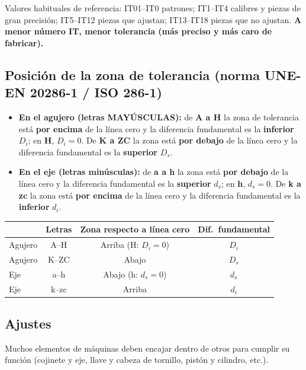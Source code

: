 \documentclass[12pt,a4paper]{article}
\begin{document}
Valores habituales de referencia: IT01--IT0 patrones; IT1--IT4 calibres y
piezas de gran precisión; IT5--IT12 piezas que ajustan; IT13--IT18 piezas que
no ajustan. \textbf{A menor número IT, menor tolerancia (más preciso y más
	caro de fabricar).}

\subsection{Posición de la zona de tolerancia (norma UNE-EN 20286-1 / ISO
	286-1)}
\begin{itemize}
	\item \textbf{En el agujero (letras MAYÚSCULAS):} de \textbf{A a H} la zona de
	      tolerancia está \textbf{por encima} de la línea cero y la diferencia
	      fundamental
	      es la \textbf{inferior} $D_i$; en \textbf{H}, $D_i = 0$. De \textbf{K a
		      ZC} la
	      zona está \textbf{por debajo} de la línea cero y la diferencia
	      fundamental es la
	      \textbf{superior} $D_s$.
	\item \textbf{En el eje (letras minúsculas):} de \textbf{a a h} la zona está
	      \textbf{por debajo} de la línea cero y la diferencia fundamental es la
	      \textbf{superior} $d_s$; en \textbf{h}, $d_s = 0$. De \textbf{k a zc} la
	      zona
	      está \textbf{por encima} de la línea cero y la diferencia fundamental es
	      la
	      \textbf{inferior} $d_i$.
\end{itemize}

\begin{center}
	\small
	\begin{tabular}{@{}lccc@{}}
		\toprule
		        & \textbf{Letras} & \textbf{Zona respecto a línea cero} &
		\textbf{Dif.\ fundamental}                                              \\
		\midrule
		Agujero & A--H            & Arriba (H: $D_i=0$)                 & $D_i$
		\\
		Agujero & K--ZC           & Abajo                               & $D_s$ \\
		Eje     & a--h            & Abajo (h: $d_s=0$)                  & $d_s$ \\
		Eje     & k--zc           & Arriba                              & $d_i$ \\
		\bottomrule
	\end{tabular}
\end{center}

\subsection{Ajustes}
Muchos elementos de máquinas deben encajar dentro de otros para cumplir su
función (cojinete y eje, llave y cabeza de tornillo, pistón y cilindro, etc.).
\end{document}
